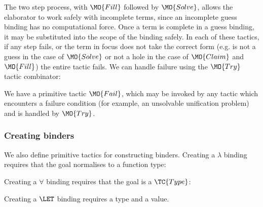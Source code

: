 The two step process, with $\MO{Fill}$ followed by $\MO{Solve}$, allows the elaborator
to work safely with incomplete terms, since an incomplete guess binding has no 
computational force. Once a term is complete in a guess binding, it may be substituted into the 
scope of the binding safely.
In each of these tactics, if any step fails, or the term in focus does not take
the correct form (e.g. is not a guess in the case of $\MO{Solve}$ or not a hole
in the case of $\MO{Claim}$ and $\MO{Fill}$) the entire tactic fails. We can
handle failure using the $\MO{Try}$ tactic combinator:


We have a primitive tactic $\MO{Fail}$, which may be invoked by
any tactic which encounters a failure condition (for example, an unsolvable unification
problem) and is handled by $\MO{Try}$.

\subsubsection{Creating binders}

We also define primitive tactics for constructing binders. Creating a $\lambda$
binding requires that the goal normalises to a function type:


\noindent
Creating a $\forall$ binding requires that the goal is a $\TC{Type}$:


\noindent
Creating a $\LET$ binding requires a type and a value.



